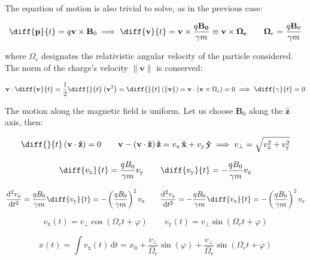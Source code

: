 The equation of motion is also trivial to solve, as in the previous case:

\begin{equation}
    \diff{\mathbf{p}}{t}=q\mathbf{v}\times\mathbf{B}_0\implies\diff{\mathbf{v}}{t}=\mathbf{v}\times\frac{q\mathbf{B_0}}{\gamma m}\equiv\mathbf{v}\times\mathbf{\Omega_c}\quad\quad\mathbf{\Omega}_c=\frac{q\mathbf{B}_0}{\gamma m}
\end{equation}

where $\Omega_c$ designates the relativistic angular velocity of the particle considered. The norm of the charge's velocity $\|\mathbf{v}\|$ is conserved:

\begin{equation}
    \mathbf{v}\cdot\diff{\mathbf{v}}{t}=\frac{1}{2}\diff{}{t}\left(\mathbf{v}^2\right)=\diff{}{t}\left(\|\mathbf{v}\|\right)=\mathbf{v}\cdot\left(\mathbf{v}\times\Omega_c\right)=0\implies\diff{\gamma}{t}=0
\end{equation}

The motion along the magnetic field is uniform. Let us choose $\mathbf{B}_0$ along the $\mathbf{\hat{z}}$ axis, then:

\begin{equation}
    \diff{}{t}\left(\mathbf{v}\cdot\mathbf{\hat{z}}\right)=0\quad\quad\mathbf{v}-(\mathbf{v}\cdot\mathbf{\hat{z}})\,\mathbf{\hat{z}}=v_\mathrm{x}\,\mathbf{\hat{x}}+v_\mathrm{y}\,\mathbf{\hat{y}}\implies v_\perp=\sqrt{v_\mathrm{x}^2+v_\mathrm{y}^2}
\end{equation}

\begin{equation}
    \diff{v_\mathrm{x}}{t}=\frac{qB_0}{\gamma m}v_\mathrm{y}\qquad\diff{v_\mathrm{y}}{t}=-\frac{qB_0}{\gamma m}v_\mathrm{x}
\end{equation}

\begin{equation}
    \frac{\mathrm{d}^2v_\mathrm{x}}{\mathrm{d}t^2}=\frac{qB_0}{\gamma m}\diff{v_\mathrm{y}}{t}=-\left(\frac{qB_0}{\gamma m}\right)^2v_\mathrm{x}\qquad\frac{\mathrm{d}^2v_\mathrm{y}}{\mathrm{d}t^2}=-\frac{qB_0}{\gamma m}\diff{v_\mathrm{x}}{t}=-\left(\frac{qB_0}{\gamma m}\right)^2v_\mathrm{y}
\end{equation}

\begin{equation}
    v_\mathrm{x}(t)=v_\perp\cos(\Omega_ct+\varphi)\qquad v_\mathrm{y}(t)=v_\perp\sin(\Omega_ct+\varphi)
\end{equation}

\begin{equation}
    x(t)=\int v_\mathrm{x}(t)\,\mathrm{d}t=x_0+\frac{v_\perp}{\Omega_c}\sin(\varphi)+\frac{v_\perp}{\Omega_c}\sin(\Omega_ct+\varphi)
\end{equation}

